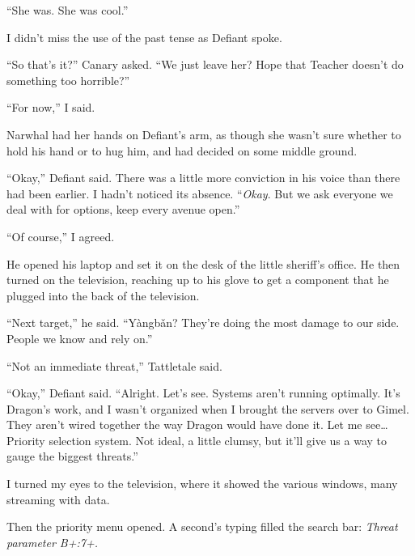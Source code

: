 ``She was.  She was cool.''



I didn't miss the use of the past tense as Defiant spoke.



``So that's it?''  Canary asked.  ``We just leave her?  Hope that Teacher doesn't do something too horrible?''



``For now,'' I said.



Narwhal had her hands on Defiant's arm, as though she wasn't sure whether to hold his hand or to hug him, and had decided on some middle ground.



``Okay,'' Defiant said.  There was a little more conviction in his voice than there had been earlier.  I hadn't noticed its absence.  ``\emph{Okay}.  But we ask everyone we deal with for options, keep every avenue open.''



``Of course,'' I agreed.



He opened his laptop and set it on the desk of the little sheriff's office.  He then turned on the television, reaching up to his glove to get a component that he plugged into the back of the television.



``Next target,'' he said.  ``Y\`{a}ngb\v{a}n?  They're doing the most damage to our side.  People we know and rely on.''



``Not an immediate threat,'' Tattletale said.



``Okay,'' Defiant said.  ``Alright.  Let's see.  Systems aren't running optimally.  It's Dragon's work, and I wasn't organized when I brought the servers over to Gimel.  They aren't wired together the way Dragon would have done it.  Let me see\ldots Priority selection system.  Not ideal, a little clumsy, but it'll give us a way to gauge the biggest threats.''



I turned my eyes to the television, where it showed the various windows, many streaming with data.



Then the priority menu opened.  A second's typing filled the search bar: \emph{Threat parameter B+:7+.}



